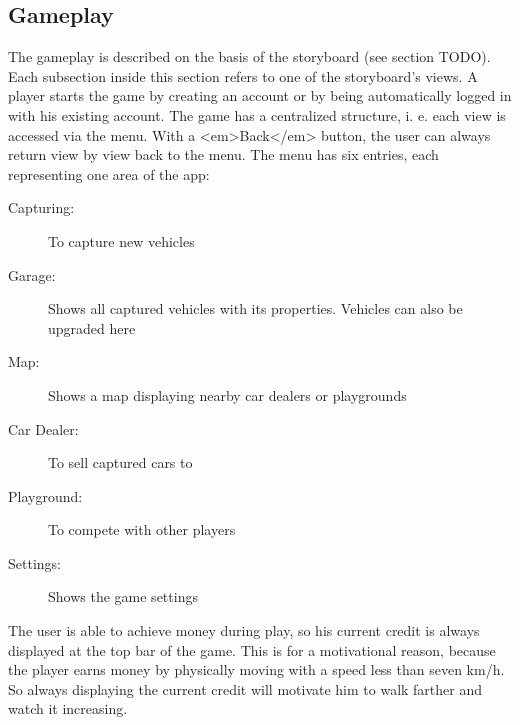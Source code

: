 \subsection{Gameplay}
The gameplay is described on the basis of the storyboard (see section TODO). Each subsection inside this section refers to one of the storyboard’s views. A player starts the game by creating an account or by being automatically logged in with his existing account.
The game has a centralized structure, i. e. each view is accessed via the menu. With a <em>Back</em> button, the user can always return view by view back to the menu. The menu has six entries, each representing one area of the app:
\begin{description}
  \item[Capturing:] To capture new vehicles
  \item[Garage:] Shows all captured vehicles with its properties. Vehicles can also be upgraded here
  \item[Map:] Shows a map displaying nearby car dealers or playgrounds
  \item[Car Dealer:] To sell captured cars to
  \item[Playground:] To compete with other players
  \item[Settings:] Shows the game settings
\end{description}
The user is able to achieve money during play, so his current credit is always displayed at the top bar of the game. This is for a motivational reason, because the player earns money by physically moving with a speed less than seven km/h. So always displaying the current credit will motivate him to walk farther and watch it increasing.

